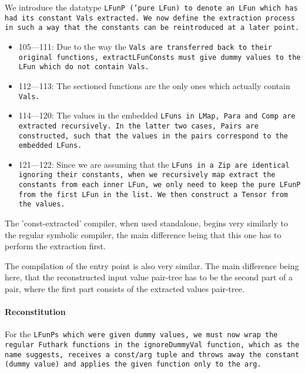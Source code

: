 
We introduce the datatype \tt{LFunP} ('pure \tt{LFun}) to denote an
\tt{LFun} which has had its constant \tt{Val}s extracted. We now define
the extraction process in such a way that the constants can be reintroduced
at a later point.


\begin{itemize}
	\item 105---111: Due to the way the \tt{Val}s are transferred back
	to their original functions, \tt{extractLFunConsts} must give dummy
	values to the \tt{LFun} which do not contain \tt{Val}s.
	\item 112---113: The sectioned functions are the only ones which
	actually contain \tt{Vals}.
	\item 114---120: The values in the embedded \tt{LFun}s in \tt{LMap},
	\tt{Para} and \tt{Comp} are extracted recursively. In the latter two
	cases, \tt{Pair}s are constructed, such that the values in the pairs
	correspond to the embedded \tt{LFun}s.
	\item 121---122: Since we are assuming that the \tt{LFun}s in a
	\tt{Zip} are identical ignoring their constants, when we recursively map
	extract the constants from each inner \tt{LFun}, we only need to keep
	the pure \tt{LFunP} from the first \tt{LFun} in the list. We then
	construct a \tt{Tensor} from the values.
\end{itemize}

The 'const-extracted' compiler, when used standalone, begins very
similarly to the regular symbolic compiler, the main difference being
that this one has to perform the extraction first.

The compilation of the entry point is also very similar. The main difference
being here, that the reconstructed input value pair-tree has to be the
second part of a pair, where the first part consists of the extracted
values pair-tree.

\paragraph{Reconstitution}

For the \tt{LFunP}s which were given dummy values, we must now wrap the
regular Futhark functions in the \tt{ignoreDummyVal} function, which as the
name suggests, receives a const/arg tuple and throws away the constant
(dummy value) and applies the given function only to the arg.

